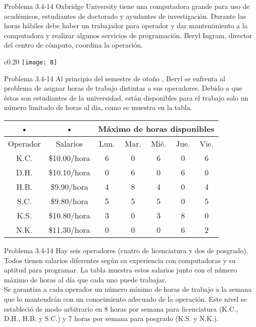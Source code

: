 \documentclass{beamer}
\begin{document}
\begin{frame}[t,fragile]{Problema 3.4-14 }
Oxbridge University tiene una computadora grande para uso de académicos, estudiantes de doctorado y ayudantes de investigación. Durante las horas hábiles debe haber un trabajador para operador y dar mantenimiento a la computadora y realizar algunos servicios  de programación. Beryl Ingram, director del centro de cómputo, coordina la operación.
\begin{wrapfigure}{c}{0.20\textwidth}
    \centering
    \texttt{[image: 8]}
\end{wrapfigure}
\end{frame}
\begin{frame}[t,fragile]{Problema 3.4-14 }
Al principio del semestre de  otoño , Beryl se enfrenta al problema de asignar horas de trabajo distintas a sus operadores. Debido a que éstos son estudiantes de la universidad, están disponibles para el trabajo solo un número limitado de horas al dia, como se muestra en la tabla. \\

\begin{tabular}{|c|c|c|c|c|c|c|}
\hline 
• & • & \multicolumn{5}{c|}{Máximo de horas disponibles} \\ 
\hline 
Operador & Salarios & Lun. & Mar. & Mié. & Jue. & Vie. \\ 
\hline 
K.C. & \$10.00/hora & 6 & 0 & 6 & 0 & 6 \\ 
\hline 
D.H. & \$10.10/hora & 0 & 6 & 0 & 6 & 0 \\ 
\hline 
H.B. & \$9.90/hora & 4 & 8 & 4 & 0 & 4 \\ 
\hline 
S.C. & \$9.80/hora & 5 & 5 & 5 & 0 & 5 \\ 
\hline 
K.S. & \$10.80/hora & 3 & 0 & 3 & 8 & 0 \\ 
\hline 
N.K. & \$11.30/hora & 0 & 0 & 0 & 6 & 2 \\ 
\hline 
\end{tabular} 
\end{frame}
\begin{frame}[t,fragile]{Problema 3.4-14 }
Hay seis operadores (cuatro de licenciatura y dos de posgrado). Todos tienen salarios diferentes según su experiencia con computadoras y su aptitud para programar. La tabla muestra estos salarios junto con el número máximo de horas al día que cada uno puede trabajar.\\
Se garantiza a cada operador un número mínimo de horas de trabajo a la semana que lo mantendrán con un conocimiento adecuado de la operación. Este nivel se estableció de modo arbitrario en 8 horas por semana para licenciatura (K.C., D.H., H.B. y S.C.) y 7 horas por semana para posgrado (K.S. y N.K.).\\
\end{frame}
\end{document}
